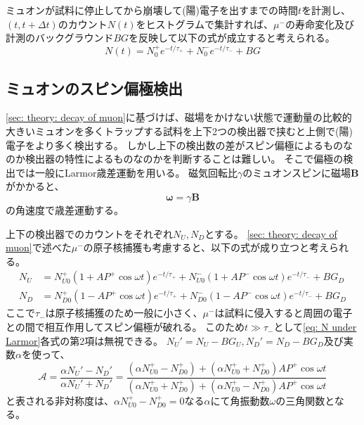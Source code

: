 \documentclass[dvipdfmx]{jsarticle}
\begin{document}

ミュオンが試料に停止してから崩壊して(陽)電子を出すまでの時間$t$を計測し、$(t,t+\Delta t)$のカウント$N(t)$をヒストグラムで集計すれば、$\mu^-$の寿命変化及び計測のバックグラウンド$BG$を反映して以下の式が成立すると考えられる。
\begin{equation}
    \label{eq: N of t considering different tau and BG}
    N(t)
    =
    N_0^+e^{-t/\tau_+}
    +
    N_0^-e^{-t/\tau_-}
    +
    BG
\end{equation}


\subsection{ミュオンのスピン偏極検出}

\ref{sec: theory: decay of muon}に基づけば、磁場をかけない状態で運動量の比較的大きいミュオンを多くトラップする試料を上下2つの検出器で挟むと上側で(陽)電子をより多く検出する。
しかし上下の検出数の差がスピン偏極によるものなのか検出器の特性によるものなのかを判断することは難しい。
そこで偏極の検出では一般にLarmor歳差運動を用いる。
磁気回転比$\gamma$のミュオンスピンに磁場$\bm{B}$がかかると、
\begin{equation}
    \label{eq: Larmor precession}
    \bm{\omega}=\gamma\bm{B}
\end{equation}
の角速度で歳差運動する。

上下の検出器でのカウントをそれぞれ$N_U, N_D$とする。
\ref{sec: theory: decay of muon}で述べた$\mu^-$の原子核捕獲も考慮すると、以下の式が成り立つと考えられる。
\begin{equation}
    \label{eq: N under Larmor}
    \begin{split}
        N_U
        &=
        N_{U0}^+(1+AP^+\cos\omega t)e^{-t/\tau_+}
        +
        N_{U0}^-(1+AP^-\cos\omega t)e^{-t/\tau_-}
        +
        BG_D
        \\
        N_D
        &=
        N_{D0}^+(1-AP^+\cos\omega t)e^{-t/\tau_+}
        +
        N_{D0}^-(1-AP^-\cos\omega t)e^{-t/\tau_-}
        +
        BG_D
    \end{split}
\end{equation}
ここで$\tau_-$は原子核捕獲のため一般に小さく、$\mu^-$は試料に侵入すると周囲の電子との間で相互作用してスピン偏極が破れる。
このため$t\gg\tau_-$として\eqref{eq: N under Larmor}各式の第2項は無視できる。
$N_U'=N_U-BG_U, N_D'=N_D-BG_D$及び実数$\alpha$を使って、
\begin{equation}
    \label{eq: asymmetry}
    \mathscr{A}
    =
    \frac{\alpha N_U'-N_D'}{\alpha N_U'+N_D'}
    =
    \frac{(\alpha N_{U0}^+-N_{D0}^+)+(\alpha N_{U0}^++N_{D0}^+)AP^+\cos\omega t}{(\alpha N_{U0}^++N_{D0}^+)+(\alpha N_{U0}^+-N_{D0}^+)AP^+\cos\omega t}
\end{equation}
と表される非対称度は、$\alpha N_{U0}^+-N_{D0}^+=0$なる$\alpha$にて角振動数$\omega$の三角関数となる。
\end{document}
